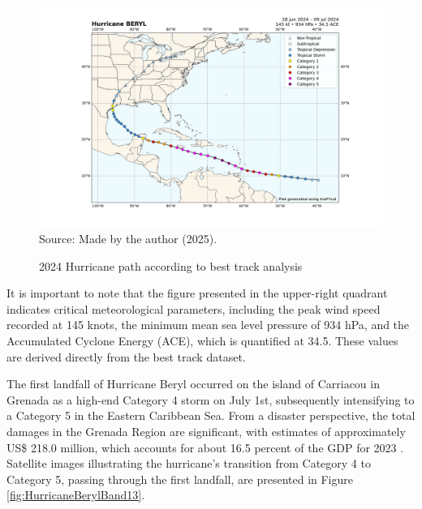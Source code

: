 \begin{figure}[h!]
	\centering
	\caption{2024 Hurricane path according to best track analysis}
	\label{fig:hurricanepath}\includegraphics[width=\textwidth,height=\textheight,keepaspectratio]{docs/figuras/chapter5/beryl_2024.png}
	\centering
	Source: Made by the author (2025).
\end{figure}

It is important to note that the figure presented in the upper-right quadrant indicates critical meteorological parameters, including the peak wind speed recorded at 145 knots, the minimum mean sea level pressure of 934 hPa, and the Accumulated Cyclone Energy (ACE), which is quantified at 34.5. These values are derived directly from the best track dataset.

The first landfall of Hurricane Beryl occurred on the island of Carriacou in Grenada as a high-end Category 4 storm on July 1st, subsequently intensifying to a Category 5 in the Eastern Caribbean Sea. From a disaster perspective, the total damages in the Grenada Region are significant, with estimates of approximately US\$ 218.0 million, which accounts for about 16.5 percent of the GDP for 2023 \cite{gunasekera2024global}. Satellite images illustrating the hurricane's transition from Category 4 to Category 5, passing through the first landfall, are presented in Figure \ref{fig:HurricaneBerylBand13}.

